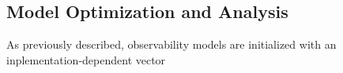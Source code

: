 \subsection{Model Optimization and Analysis}

As previously described, observability models are initialized with an inplementation-dependent vector

\subsubsection{}